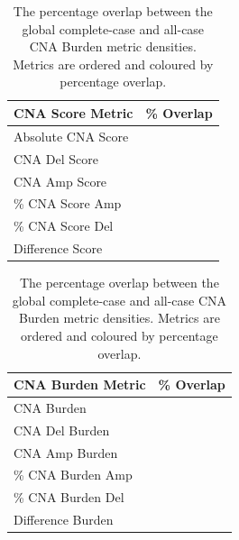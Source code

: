 \begin{table}[h]
    \begin{minipage}{.49\linewidth}
    \caption[The percentage overlap between the global complete-case and all-case CNA Score metric densities.]{
    The percentage overlap between the global complete-case and all-case CNA Score metric densities.
    Metrics are ordered and coloured by percentage overlap.}
      \centering 
\begin{tabular}[t]{l>{}r}
\toprule
CNA Score Metric & \% Overlap\\
\midrule
Absolute CNA Score & \cellcolor[HTML]{414487}{\textcolor{white}{96.55}}\\
 
CNA Del Score & \cellcolor[HTML]{482374}{\textcolor{white}{97.15}}\\
 
CNA Amp Score & \cellcolor[HTML]{481769}{\textcolor{white}{97.35}}\\
 
\% CNA Score Amp & \cellcolor[HTML]{46085B}{\textcolor{white}{97.58}}\\
 
\% CNA Score Del & \cellcolor[HTML]{440154}{\textcolor{white}{97.69}}\\
 
Difference Score & \cellcolor[HTML]{440154}{\textcolor{white}{97.69}}\\
\bottomrule
\end{tabular} \label{table:CNAScoreT1}
    \end{minipage}%
    \hspace{0.4cm}
    \begin{minipage}{.49\linewidth}
      \centering
    \caption[The percentage overlap between the global complete-case and all-case CNA Burden metric densities.]{
    The percentage overlap between the global complete-case and all-case CNA Burden metric densities.
    Metrics are ordered and coloured by percentage overlap.} 
\begin{tabular}[t]{l>{}r}
\toprule
CNA Burden Metric & \% Overlap\\
\midrule
CNA Burden & \cellcolor[HTML]{414487}{\textcolor{white}{96.76}}\\
 
CNA Del Burden & \cellcolor[HTML]{472D7B}{\textcolor{white}{97.18}}\\
 
CNA Amp Burden & \cellcolor[HTML]{482979}{\textcolor{white}{97.24}}\\
 
\% CNA Burden Amp & \cellcolor[HTML]{481C6E}{\textcolor{white}{97.45}}\\
 
\% CNA Burden Del & \cellcolor[HTML]{481C6E}{\textcolor{white}{97.45}}\\
 
Difference Burden & \cellcolor[HTML]{440154}{\textcolor{white}{97.87}}\\
\bottomrule
\end{tabular} \label{table:CNABurdenT1}
    \end{minipage}
\end{table}
\clearpage

